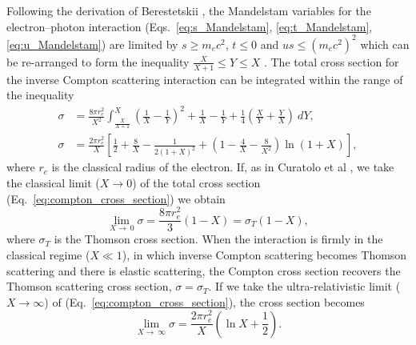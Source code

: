\documentclass[../main.tex]{subfiles}
\begin{document}
Following the derivation of Berestetskii \cite{berestetskii1982quantum}, the Mandelstam variables for the electron--photon interaction (Eqs.~\ref{eq:s_Mandelstam}, \ref{eq:t_Mandelstam}, \ref{eq:u_Mandelstam}) are limited by $s\geq m_{e}c^{2}$, $t \leq 0$ and $u s \leq \left(m_{e}c^{2}\right)^{2}$ which can be re-arranged to form the inequality $\frac{X}{X+1} \leq Y \leq X$ \cite{sun2009characterizations}. The total cross section for the inverse Compton scattering interaction \cite{berestetskii1982quantum} can be integrated within the range of the inequality
\begin{align}
\sigma &= \frac{8\pi r_{e}^{2}}{X^{2}}\int_{\frac{X}{X+1}}^{X}\left(\frac{1}{X}-\frac{1}{Y}\right)^{2}+\frac{1}{X}-\frac{1}{Y}+\frac{1}{4}\left(\frac{X}{Y}+\frac{Y}{X}\right)~dY, \nonumber \\
\sigma &= \frac{2\pi r_{e}^{2}}{X}\left[\frac{1}{2}+\frac{8}{X}-\frac{1}{2\left(1+X\right)^{2}}+\left(1-\frac{4}{X}-\frac{8}{X^{2}}\right)\ln{\left(1+X\right)}\right],
\label{eq:compton_cross_section}
\end{align}
where $r_{e}$ is the classical radius of the electron. If, as in Curatolo et al \cite{curatolo2017analytical}, we take the classical limit ($X \to 0$) of the total cross section (Eq.~\ref{eq:compton_cross_section}) we obtain
\begin{equation}
\lim_{X \to ~0} \sigma = \frac{8\pi r_{e}^{2}}{3}\left(1-X\right) = \sigma_{T}\left(1-X\right),
\label{eq:compton_cross_section_classical_limit}
\end{equation}
where $\sigma_{T}$ is the Thomson cross section. When the interaction is firmly in the classical regime ($X \ll 1$), in which inverse Compton scattering becomes Thomson scattering and there is elastic scattering, the Compton cross section recovers the Thomson scattering cross section, $\sigma = \sigma_{T}$. If we take the ultra-relativistic limit ($X \to \infty$) of (Eq.~\ref{eq:compton_cross_section}), the cross section becomes
\begin{equation}
\lim_{X \to ~\infty} \sigma = \frac{2\pi r_{e}^{2}}{X}\left(\ln{X}+\frac{1}{2}\right).
\label{eq:compton_cross_section_ultrarelativistic_limit}
\end{equation}
\end{document}
